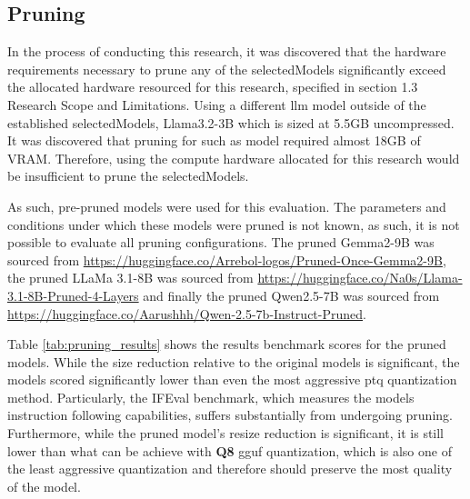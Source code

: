 \documentclass{ifacconf}
\begin{document}
	\subsection{Pruning}
	In the process of conducting this research, it was discovered that the hardware requirements necessary to prune any of the \gls{selectedModels} significantly exceed the allocated hardware resourced for this research, specified in section 1.3 Research Scope and Limitations. Using a different \gls{llm} model outside of the established \gls{selectedModels}, Llama3.2-3B which is sized at 5.5GB uncompressed. It was discovered that pruning for such as model required almost 18GB of VRAM. Therefore, using the compute hardware allocated for this research would be insufficient to prune the \gls{selectedModels}.
	
	As such, pre-pruned models were used for this evaluation. The parameters and conditions under which these models were pruned is not known, as such, it is not possible to evaluate all pruning configurations. 
	The pruned Gemma2-9B was sourced from \url{https://huggingface.co/Arrebol-logos/Pruned-Once-Gemma2-9B}, the pruned LLaMa 3.1-8B was sourced from \url{https://huggingface.co/Na0s/Llama-3.1-8B-Pruned-4-Layers} and finally the pruned Qwen2.5-7B was sourced from \url{https://huggingface.co/Aarushhh/Qwen-2.5-7b-Instruct-Pruned}.
	
	
	Table \ref{tab:pruning_results} shows the results benchmark scores for the pruned models. While the size reduction relative to the original models is significant, the models scored significantly lower than even the most aggressive \gls{ptq} quantization method. Particularly, the IFEval benchmark, which measures the models instruction following capabilities, suffers substantially from undergoing pruning. Furthermore, while the pruned model's resize reduction is significant, it is still lower than what can be achieve with \textbf{Q8} \gls{gguf} quantization, which is also one of the least aggressive quantization and therefore should preserve the most quality of the model.
	
	\vfill
	\clearpage
	\pagebreak
	
\end{document}
